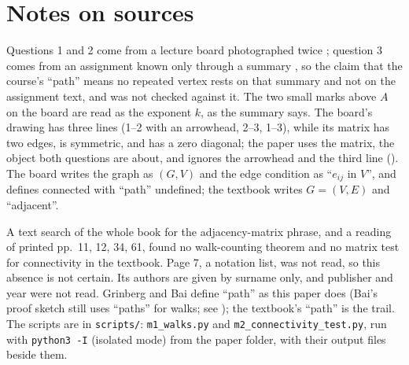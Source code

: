 \section*{Notes on sources}

Questions 1 and 2 come from a lecture board photographed twice \cite{whiteboard1,whiteboard2}; question 3 comes from an assignment known only through a summary \cite{user_statements}, so the claim that the course's ``path'' means no repeated vertex rests on that summary and not on the assignment text, and was not checked against it. The two small marks above $A$ on the board are read as the exponent $k$, as the summary says. The board's drawing has three lines (1--2 with an arrowhead, 2--3, 1--3), while its matrix has two edges, is symmetric, and has a zero diagonal; the paper uses the matrix, the object both questions are about, and ignores the arrowhead and the third line (). The board writes the graph as $(G, V)$ and the edge condition as ``$e_{ij}$ in $V$'', and defines connected with ``path'' undefined; the textbook writes $G = (V,E)$ and ``adjacent''.

A text search of the whole book for the adjacency-matrix phrase, and a reading of printed pp.~11, 12, 34, 61, found no walk-counting theorem and no matrix test for connectivity in the textbook. Page 7, a notation list, was not read, so this absence is not certain. Its authors are given by surname only, and publisher and year were not read. Grinberg and Bai define ``path'' as this paper does \cite{grinberg_graph_theory,bai_bimsa_adjacency} (Bai's proof sketch still uses ``paths'' for walks; see ); the textbook's ``path'' is the trail. The scripts are in \texttt{scripts/}: \texttt{m1\_walks.py} and \texttt{m2\_connectivity\_test.py}, run with \texttt{python3 -I} (isolated mode) from the paper folder, with their output files beside them.
